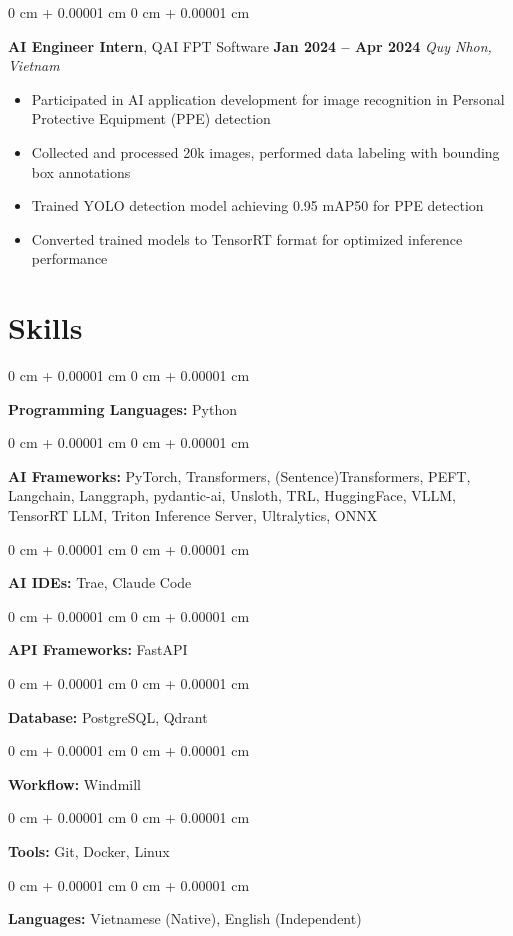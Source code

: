 \documentclass[10pt, letterpaper]{article}
\newenvironment{highlightsforbulletentries}{
    \begin{itemize}[
        topsep=0.10 cm,
        parsep=0.10 cm,
        partopsep=0pt,
        itemsep=0pt,
        leftmargin=10pt
    ]
}{
    \end{itemize}
} %
\newenvironment{onecolentry}{
    \begin{adjustwidth}{
        0 cm + 0.00001 cm
    }{
        0 cm + 0.00001 cm
    }
}{
    \end{adjustwidth}
} %
\newenvironment{experienceentry}{
    \begin{onecolentry}
}{
    \end{onecolentry}
} %
\begin{document}
        \begin{experienceentry}
            \textbf{AI Engineer Intern}, QAI FPT Software \hfill \textbf{Jan 2024 -- Apr 2024}
            \textit{Quy Nhon, Vietnam}
            \begin{highlightsforbulletentries}
                \item Participated in AI application development for image recognition in Personal Protective Equipment (PPE) detection
                \item Collected and processed 20k images, performed data labeling with bounding box annotations
                \item Trained YOLO detection model achieving 0.95 mAP50 for PPE detection
                \item Converted trained models to TensorRT format for optimized inference performance
            \end{highlightsforbulletentries}
        \end{experienceentry}



    

    
    \section{Skills}

        \begin{onecolentry}
            \textbf{Programming Languages:} Python
        \end{onecolentry}

        \begin{onecolentry}
            \textbf{AI Frameworks:} PyTorch, Transformers, (Sentence)Transformers, PEFT, Langchain, Langgraph, pydantic-ai, Unsloth, TRL, HuggingFace, VLLM, TensorRT LLM, Triton Inference Server, Ultralytics, ONNX
        \end{onecolentry}

        \begin{onecolentry}
            \textbf{AI IDEs:} Trae, Claude Code
        \end{onecolentry}

        \begin{onecolentry}
            \textbf{API Frameworks:} FastAPI
        \end{onecolentry}

        \begin{onecolentry}
            \textbf{Database:} PostgreSQL, Qdrant
        \end{onecolentry}

        \begin{onecolentry}
            \textbf{Workflow:} Windmill
        \end{onecolentry}

        \begin{onecolentry}
            \textbf{Tools:} Git, Docker, Linux
        \end{onecolentry}

        \begin{onecolentry}
            \textbf{Languages:} Vietnamese (Native), English (Independent)
        \end{onecolentry}


    
\end{document}

